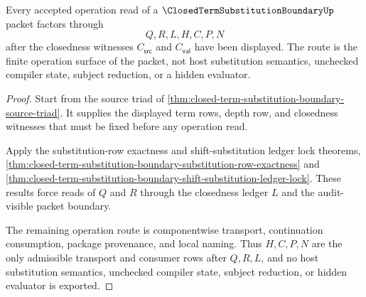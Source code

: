 \begin{theorem}
\label{thm:closed-term-substitution-boundary-operation-route}
Every accepted operation read of a $\ClosedTermSubstitutionBoundaryUp$ packet factors through
$$
Q,R,L,H,C,P,N
$$
after the closedness witnesses $C_{\mathsf{src}}$ and $C_{\mathsf{val}}$ have been displayed. The route is the finite operation surface of the packet, not host substitution semantics, unchecked compiler state, subject reduction, or a hidden evaluator.
\end{theorem}
\begin{proof}
Start from the source triad of \autoref{thm:closed-term-substitution-boundary-source-triad}. It supplies the displayed term rows, depth row, and closedness witnesses that must be fixed before any operation read.

Apply the substitution-row exactness and shift-substitution ledger lock theorems, \autoref{thm:closed-term-substitution-boundary-substitution-row-exactness} and \autoref{thm:closed-term-substitution-boundary-shift-substitution-ledger-lock}. These results force reads of $Q$ and $R$ through the closedness ledger $L$ and the audit-visible packet boundary.

The remaining operation route is componentwise transport, continuation consumption, package provenance, and local naming. Thus $H,C,P,N$ are the only admissible transport and consumer rows after $Q,R,L$, and no host substitution semantics, unchecked compiler state, subject reduction, or hidden evaluator is exported.
\end{proof}

